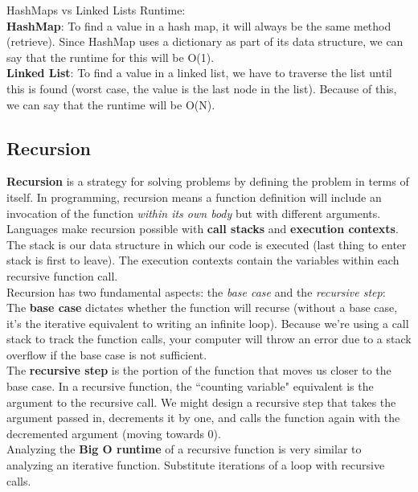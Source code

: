 \documentclass[11pt, a4paper]{article}
\begin{document}
\begin{spacing}{1.1}
	HashMaps vs Linked Lists Runtime: \vspace*{1mm} \\
	\textbf{HashMap}: To find a value in a hash map, it will always be the same method (retrieve). Since HashMap uses a dictionary as part of its data structure, we can say that the runtime for this will be O(1). \vspace*{1mm} \\
	\textbf{Linked List}: To find a value in a linked list, we have to traverse the list until this is found (worst case, the value is the last node in the list). Because of this, we can say that the runtime will be O(N). \newpage
	\subsection{Recursion}
	\textbf{Recursion} is a strategy for solving problems by defining the problem in terms of itself. In programming, recursion means a function definition will include an invocation of the function \textit{within its own body} but with different arguments. \vspace*{2mm}\\
	Languages make recursion possible with \textbf{call stacks} and \textbf{execution contexts}. The stack is our data structure in which our code is executed (last thing to enter stack is first to leave). The execution contexts contain the variables within each recursive function call. \vspace*{2mm}\\
	Recursion has two fundamental aspects: the \textit{base case} and the \textit{recursive step}: \\
	The \textbf{base case} dictates whether the function will recurse (without a base case, it’s the iterative equivalent to writing an infinite loop). Because we’re using a call stack to track the function calls, your computer will throw an error due to a stack overflow if the base case is not sufficient. \\
	The \textbf{recursive step} is the portion of the function that moves us closer to the base case. In a recursive function, the ``counting variable" equivalent is the argument to the recursive call. We might design a recursive step that takes the argument passed in, decrements it by one, and calls the function again with the decremented argument (moving towards 0). \vspace*{2mm} \\		
	Analyzing the \textbf{Big O runtime} of a recursive function is very similar to analyzing an iterative function. Substitute iterations of a loop with recursive calls. \vspace*{2mm} \\	

\end{spacing}
\end{document}
